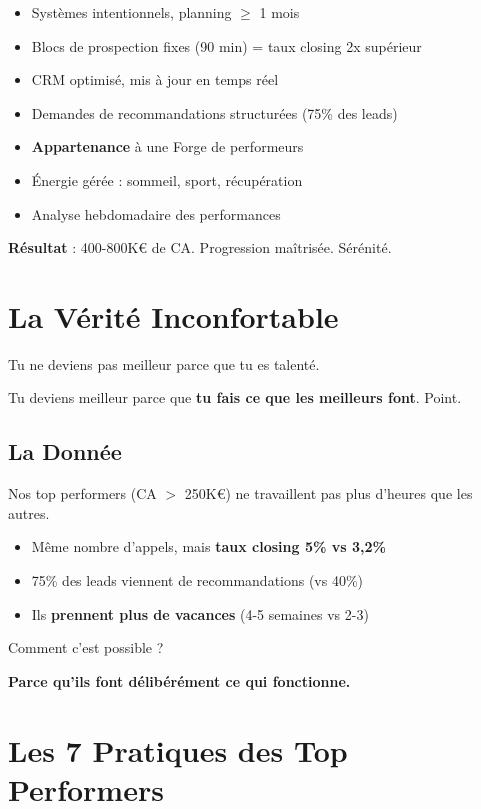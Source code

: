 \documentclass[12pt,a4paper,openany]{book}
\begin{document}
\begin{itemize}
\item Systèmes intentionnels, planning $\geq$ 1 mois
\item Blocs de prospection fixes (90 min) = taux closing 2x supérieur
\item CRM optimisé, mis à jour en temps réel
\item Demandes de recommandations structurées (75\% des leads)
\item \textbf{Appartenance} à une Forge de performeurs
\item Énergie gérée : sommeil, sport, récupération
\item Analyse hebdomadaire des performances
\end{itemize}

\textbf{Résultat} : 400-800K\euro{} de CA. Progression maîtrisée. Sérénité.

\section{La Vérité Inconfortable}

Tu ne deviens pas meilleur parce que tu es talenté.

Tu deviens meilleur parce que \textbf{tu fais ce que les meilleurs font}. Point.

\subsection{La Donnée}

Nos top performers (CA $>$ 250K\euro{}) ne travaillent pas plus d'heures que les autres.

\begin{itemize}
\item Même nombre d'appels, mais \textbf{taux closing 5\% vs 3,2\%}
\item 75\% des leads viennent de recommandations (vs 40\%)
\item Ils \textbf{prennent plus de vacances} (4-5 semaines vs 2-3)
\end{itemize}

Comment c'est possible ?

\textbf{Parce qu'ils font délibérément ce qui fonctionne.}

\section{Les 7 Pratiques des Top Performers}
\end{document}
